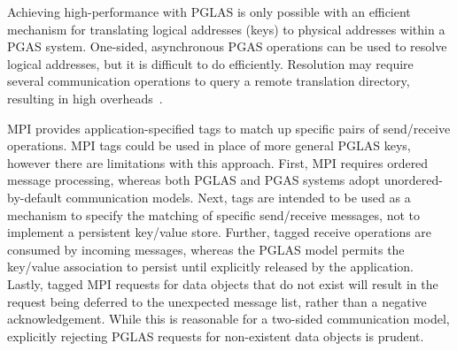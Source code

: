 

Achieving high-performance with PGLAS is only possible with an efficient
mechanism for translating logical addresses (keys) to physical addresses within
a PGAS system. One-sided, asynchronous PGAS operations can be used to resolve
logical addresses, but it is difficult to do efficiently. Resolution may
require several communication operations to query a remote translation 
directory, resulting in high overheads~\cite{namashivayam:15}.

MPI provides application-specified tags to match up specific pairs of
send/receive operations. MPI tags could be used in place of more general PGLAS
keys, however there are limitations with this approach. First, MPI requires
ordered message processing, whereas both PGLAS and PGAS systems adopt
unordered-by-default communication models. Next, tags are intended to be used
as a mechanism to specify the matching of specific send/receive messages, not
to implement a persistent key/value store. Further, tagged receive operations are
consumed by incoming messages, whereas the PGLAS model permits the key/value
association to persist until explicitly released by the application. Lastly,
tagged MPI requests for data objects that do not exist will result in the
request being deferred to the unexpected message list, rather than a negative
acknowledgement. While this is reasonable for a two-sided communication model,
explicitly rejecting PGLAS requests for non-existent data objects is prudent.


